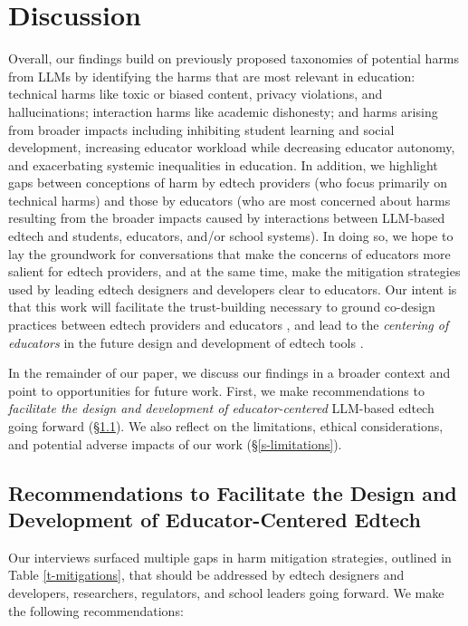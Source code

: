 \section{Discussion}\label{s-discussion}

Overall, our findings build on previously proposed taxonomies of potential harms from LLMs \cite{bender_dangers_2021, weidinger_taxonomy_2022} by identifying the harms that are most relevant in education: technical harms like toxic or biased content, privacy violations, and hallucinations; interaction harms like academic dishonesty; and harms arising from broader impacts including inhibiting student learning and social development, increasing educator workload while decreasing educator autonomy, and exacerbating systemic inequalities in education. In addition, we highlight gaps between conceptions of harm by edtech providers (who focus primarily on technical harms) and those by educators (who are most concerned about harms resulting from the broader impacts caused by interactions between LLM-based edtech and students, educators, and/or school systems). In doing so, we hope to lay the groundwork for conversations that make the concerns of educators more salient for edtech providers, and at the same time, make the mitigation strategies used by leading edtech designers and developers clear to educators. Our intent is that this work will facilitate the trust-building necessary to ground co-design practices between edtech providers and educators \cite{cardona_artificial_2023}, and lead to the \textit{centering of educators} in the future design and development of edtech tools \cite{kizilcec2024advance}.

In the remainder of our paper, we discuss our findings in a broader context and point to opportunities for future work. First, we make recommendations to \textit{facilitate the design and development of educator-centered} LLM-based edtech going forward (\S\ref{s-opportunities}). We also reflect on the limitations, ethical considerations, and potential adverse impacts of our work (\S\ref{s-limitations}).




\subsection{Recommendations to Facilitate the Design and Development of Educator-Centered Edtech}\label{s-opportunities}

Our interviews surfaced multiple gaps in harm mitigation strategies, outlined in Table \ref{t-mitigations}, that should be addressed by edtech designers and developers, researchers, regulators, and school leaders going forward. We make the following recommendations:

